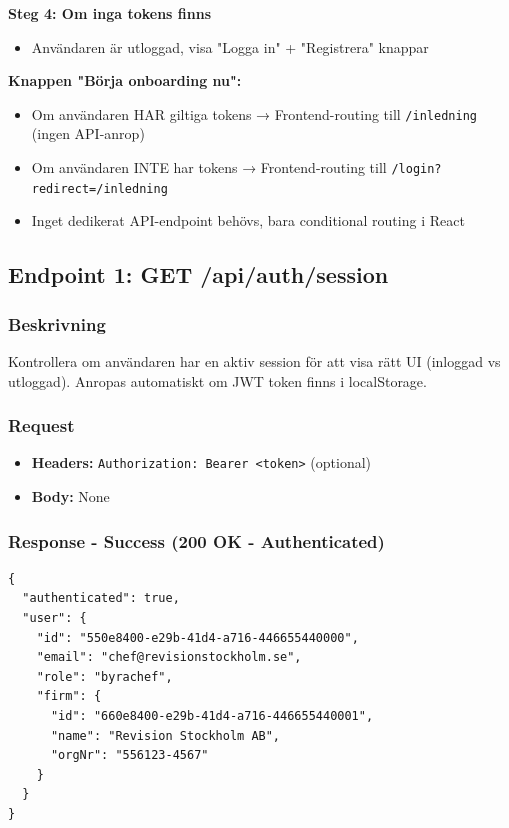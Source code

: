\documentclass[12pt,a4paper]{article}
\begin{document}
\textbf{Steg 4: Om inga tokens finns}
\begin{itemize}[noitemsep]
  \item Användaren är utloggad, visa "Logga in" + "Registrera" knappar
\end{itemize}

\textbf{Knappen "Börja onboarding nu":}
\begin{itemize}[noitemsep]
  \item Om användaren HAR giltiga tokens → Frontend-routing till \texttt{/inledning} (ingen API-anrop)
  \item Om användaren INTE har tokens → Frontend-routing till \texttt{/login?redirect=/inledning}
  \item Inget dedikerat API-endpoint behövs, bara conditional routing i React
\end{itemize}

\subsection{Endpoint 1: GET /api/auth/session}

\subsubsection{Beskrivning}
Kontrollera om användaren har en aktiv session för att visa rätt UI (inloggad vs utloggad). Anropas automatiskt om JWT token finns i localStorage.

\subsubsection{Request}
\begin{itemize}[noitemsep]
  \item \textbf{Headers:} \texttt{Authorization: Bearer <token>} (optional)
  \item \textbf{Body:} None
\end{itemize}

\subsubsection{Response - Success (200 OK - Authenticated)}
\begin{lstlisting}
{
  "authenticated": true,
  "user": {
    "id": "550e8400-e29b-41d4-a716-446655440000",
    "email": "chef@revisionstockholm.se",
    "role": "byrachef",
    "firm": {
      "id": "660e8400-e29b-41d4-a716-446655440001",
      "name": "Revision Stockholm AB",
      "orgNr": "556123-4567"
    }
  }
}
\end{lstlisting}
\end{document}
